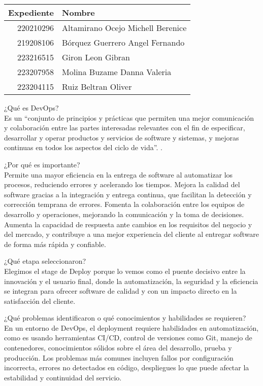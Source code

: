 \documentclass[12pt,a4paper]{article}
\author{Equipo de Ingeniería de Software 2}
\date{\today}
\begin{document}
\begin{center}
    \begin{tabular}{r|l}
        \textbf{Expediente} & \textbf{Nombre} \\ \hline
        220210296 & Altamirano Ocejo Michell Berenice \\
        219208106 & Bórquez Guerrero Angel Fernando \\
        223216515 & Giron Leon Gibran \\
        223207958 & Molina Buzame Danna Valeria \\
        223204115 & Ruiz Beltran Oliver
    \end{tabular}
\end{center}

¿Qué es DevOps? \\
Es un “conjunto de principios y prácticas que permiten una mejor comunicación y colaboración entre las partes interesadas relevantes con el fin de especificar, desarrollar y operar productos y servicios de software y sistemas, y mejoras continuas en todos los aspectos del ciclo de vida”. 
\parencite{ieee2021standard}.

¿Por qué es importante? \\
Permite una mayor eficiencia en la entrega de software al automatizar los procesos, reduciendo errores y acelerando los tiempos. Mejora la calidad del software gracias a la integración y entrega continua, que facilitan la detección y corrección temprana de errores. Fomenta la colaboración entre los equipos de desarrollo y operaciones, mejorando la comunicación y la toma de decisiones. Aumenta la capacidad de respuesta ante cambios en los requisitos del negocio y del mercado, y contribuye a una mejor experiencia del cliente al entregar software de forma más rápida y confiable. 
\parencite{nivelics2023}

¿Qué etapa seleccionaron? \\
Elegimos el stage de Deploy porque lo vemos como el puente decisivo entre la innovación y el usuario final, donde la automatización, la seguridad y la eficiencia se integran para ofrecer software de calidad y con un impacto directo en la satisfacción del cliente.

¿Qué problemas identificaron o qué conocimientos y habilidades se requieren? \\
En un entorno de DevOps, el deployment requiere habilidades en automatización, como es usando herramientas CI/CD, control de versiones como Git, manejo de contenedores, conocimientos sólidos sobre el área del desarrollo, prueba y producción.
Los problemas más comunes incluyen fallos por configuración incorrecta, errores  no detectados en código, despliegues lo que puede afectar la estabilidad y continuidad del servicio. 
\end{document}

